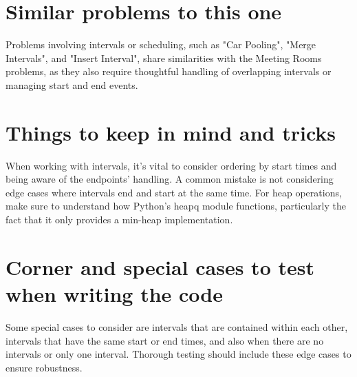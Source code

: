 \section*{Similar problems to this one}
Problems involving intervals or scheduling, such as "Car Pooling", "Merge Intervals", and "Insert Interval", share similarities with the Meeting Rooms problems, as they also require thoughtful handling of overlapping intervals or managing start and end events.

\section*{Things to keep in mind and tricks}
When working with intervals, it's vital to consider ordering by start times and being aware of the endpoints' handling. A common mistake is not considering edge cases where intervals end and start at the same time. For heap operations, make sure to understand how Python's heapq module functions, particularly the fact that it only provides a min-heap implementation.

\section*{Corner and special cases to test when writing the code}
Some special cases to consider are intervals that are contained within each other, intervals that have the same start or end times, and also when there are no intervals or only one interval. Thorough testing should include these edge cases to ensure robustness.